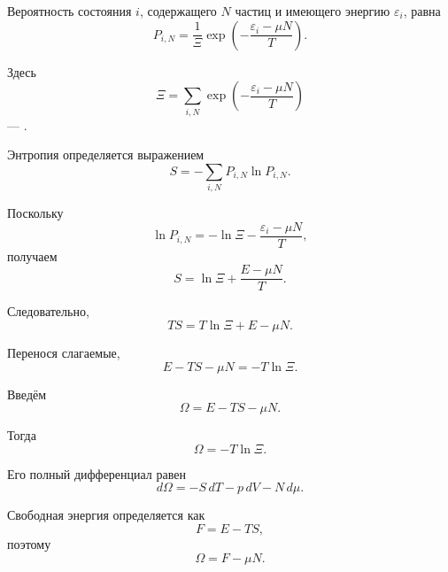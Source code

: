 \documentclass[../final.tex]{subfiles}
\begin{document}
Вероятность состояния $i$, содержащего $N$ частиц и имеющего энергию
$\varepsilon_i$, равна
%
\begin{equation*}
    P_{i,N}
    =
    \frac{1}{\Xi}
    \exp
    \left(
        -\frac{\varepsilon_i-\mu N}{T}
    \right).
\end{equation*}

Здесь
%
\[
    \boxed{
        \Xi
        =
        \sum_{i,N}
        \exp
        \left(
            -\frac{\varepsilon_i-\mu N}{T}
        \right)
    }
\]
%
--- .

Энтропия определяется выражением
%
\begin{equation*}
    S
    =
    -\sum_{i,N}
    P_{i,N}\ln P_{i,N}.
\end{equation*}

Поскольку
%
\begin{equation*}
    \ln P_{i,N}
    =
    -\ln\Xi
    -
    \frac{\varepsilon_i-\mu N}{T},
\end{equation*}
%
получаем
%
\begin{equation*}
    S
    =
    \ln\Xi
    +
    \frac{E-\mu N}{T}.
\end{equation*}

Следовательно,
%
\begin{equation*}
    TS
    =
    T\ln\Xi
    +
    E
    -
    \mu N.
\end{equation*}

Перенося слагаемые,
%
\begin{equation*}
    E
    -
    TS
    -
    \mu N
    =
    -T\ln\Xi.
\end{equation*}

Введём 
%
\begin{equation*}
    \Omega
    =
    E
    -
    TS
    -
    \mu N.
\end{equation*}

Тогда
%
\[
    \boxed{
        \Omega
        =
        -T\ln\Xi
    }.
\]

Его полный дифференциал равен
%
\[
    \boxed{
        d\Omega
        =
        -S\,dT
        -
        p\,dV
        -
        N\,d\mu
    }.
\]

Свободная энергия определяется как
%
\begin{equation*}
    F
    =
    E-TS,
\end{equation*}
%
поэтому
%
\begin{equation*}
    \Omega
    =
    F-\mu N.
\end{equation*}
\end{document}
